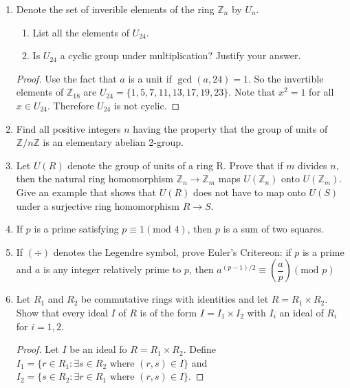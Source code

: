 \documentclass{article}
\theoremstyle{definition}
\begin{document}
\begin{enumerate}
            \item Denote the set of inverible elements of the ring $\mathbb{Z}_n$ by $U_n$.
                \begin{enumerate}
                    \item List all the elements of $U_{24}$.
                    \item Is $U_{24}$ a cyclic group under multiplication? Justify your answer.
                \end{enumerate}

                \begin{proof}
                    Use the fact that $a$ is a unit if $\gcd(a,24)=1$. So the invertible elements of $\mathbb{Z}_{18}$ are $U_{24}=\{1,5,7,11,13,17,19,23\}$. Note that $x^2=1$ for all $x\in U_{24}$. Therefore $U_{24}$ is not cyclic.
                \end{proof}

            \item Find all positive integers $n$ having the property that the group of units of $\mathbb{Z}/n\mathbb{Z}$ is an elementary abelian 2-group.
            
            \item Let $U(R)$ denote the group of units of a ring R. Prove that if $m$ divides $n$, then the natural ring homomorphism $\mathbb{Z}_n\to\mathbb{Z}_m$ maps $U(\mathbb{Z}_n)$ onto $U(\mathbb{Z}_m)$. Give an example that shows that $U(R)$ does not have to map onto $U(S)$ under a surjective ring homomorphism $R\to S$.
            
            \item If $p$ is a prime satisfying $p\equiv 1(\text{mod } 4)$, then $p$ is a sum of two squares.
            
            \item If $(\div)$ denotes the Legendre symbol, prove Euler's Critereon: if $p$ is a prime and $a$ is any integer relatively prime to $p$, then $a^{(p-1)/2}\equiv \left(\dfrac{a}{p}\right) (\text{mod } p)$
            
            \item Let $R_1$ and $R_2$ be commutative rings with identities and let $R=R_1\times R_2$. Show that every ideal $I$ of $R$ is of the form $I=I_1\times I_2$ with $I_i$ an ideal of $R_i$ for $i=1,2$.
            
                \begin{proof}
                    Let $I$ be an ideal fo $R=R_1\times R_2$. Define $I_1=\{r\in R_1:\exists s\in R_2 \text{ where } (r,s)\in I\}$ and $I_2=\{s\in R_2: \exists r \in R_1 \text{ where } (r,s)\in I\}$. 
                    

\end{proof}
\end{enumerate}
\end{document}
